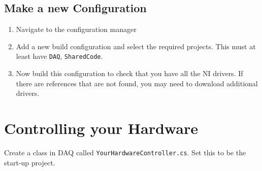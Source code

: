 \documentclass{article}
\begin{document}
\subsection{Make a new Configuration}
\begin{enumerate}
\item Navigate to the configuration manager
\item Add a new build configuration and select the required projects. This must at least have \lstinline|DAQ|, \lstinline|SharedCode|.
\item Now build this configuration to check that you have all the NI drivers. If there are references that are not found, you may need to download additional drivers.
\end{enumerate}
\section{Controlling your Hardware}
Create a class in DAQ called \lstinline|YourHardwareController.cs|. Set this to be the start-up project.
\end{document}
